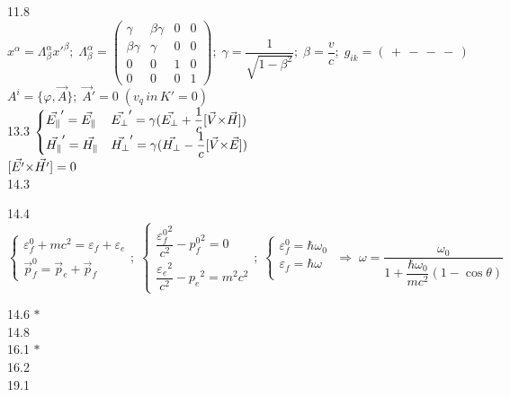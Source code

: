 \num{11.8}
$x^\alpha = \Lambda^\alpha_\beta {x'}^\beta ;\; \Lambda^\alpha_\beta =
\begin{pmatrix}\gamma & \beta\gamma & 0 & 0 \\ \beta\gamma & \gamma & 0 & 0 \\ 0 & 0 & 1 & 0 \\ 0 & 0 & 0 & 1 \end{pmatrix};\;\gamma = \dfrac1{\sqrt{1-\beta^2}};\;\beta=\dfrac{v}{c};\;g_{ik}=(\,+\,-\,-\,-\,)$\\
$A^i = \{\varphi, \vec{A} \};\; \vec{A}'=0\; (v_q\, in\, K' = 0) $\\

\num{13.3}
$\begin{cases}
    \vec{E_\|}'=\vec{E_\|} & \vec{E_\perp}' = \gamma(\vec{E_\perp}+\dfrac1{c}[\vec{V}{\times}\vec{H}] ) \\
    \vec{H_\|}'=\vec{H_\|} & \vec{H_\perp}' = \gamma(\vec{H_\perp}-\dfrac1{c}[\vec{V}{\times}\vec{E}] )
\end{cases}$\\
$[\vec{E'}{\times}\vec{H'}]=0$\\

\num{14.3}

\num{14.4}
$\begin{cases}
    \varepsilon_f^0 + mc^2 = \varepsilon_f + \varepsilon_e \\
    \vec{p}_f^0 = \vec{p}_e + \vec{p}_f
\end{cases};\;
\begin{cases}
    \dfrac{{\varepsilon_f^0}^2}{c^2}-{p^0_f}^2 = 0 \\
    \dfrac{{\varepsilon_e}^2}{c^2}-{p_e}^2 = m^2 c^2
\end{cases};\;
\begin{cases}
    \varepsilon^0_f = \hbar\omega_0 \\
    \varepsilon_f = \hbar\omega \\
\end{cases}\;\Rightarrow\; \omega = \dfrac{\omega_0}{1+\dfrac{\hbar\omega_0}{mc^2}(1-\cos\theta)}$

\num{14.6}
$* $\\

\num{14.8}
$ $\\

\num{16.1}
$* $\\

\num{16.2}
$ $\\

\num{19.1}
$ $\\

